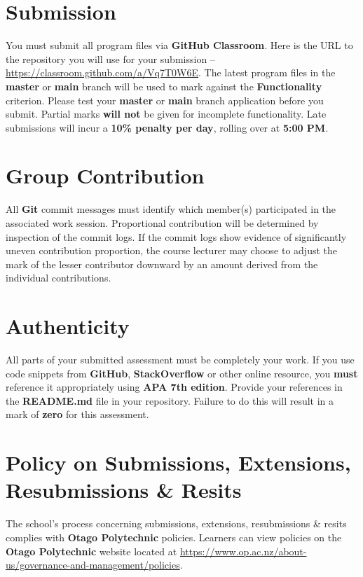 \documentclass{article}
\begin{document}
\section*{Submission}
You must submit all program files via \textbf{GitHub Classroom}. Here is the URL to the repository you will use for your submission – \href{https://classroom.github.com/a/Vq7T0W6E}{https://classroom.github.com/a/Vq7T0W6E}. The latest program files in the \textbf{master} or \textbf{main} branch will be used to mark against the \textbf{Functionality} criterion. Please test your \textbf{master} or \textbf{main} branch application before you submit. Partial marks \textbf{will not} be given for incomplete functionality. Late submissions will incur a \textbf{10\% penalty per day}, rolling over at \textbf{5:00 PM}.

\section*{Group Contribution}
All \textbf{Git} commit messages must identify which member(s) participated in the associated work session. Proportional contribution will be determined by inspection of the commit logs. If the commit logs show evidence of significantly uneven contribution proportion, the course lecturer may choose to adjust the mark of the lesser contributor downward by an amount derived from the individual contributions.

\section*{Authenticity}
All parts of your submitted assessment must be completely your work. If you use code snippets from \textbf{GitHub}, \textbf{StackOverflow} or other online resource, you \textbf{must} reference it appropriately using \textbf{APA 7th edition}. Provide your references in the \textbf{README.md} file in your repository. Failure to do this will result in a mark of \textbf{zero} for this assessment.

\section*{Policy on Submissions, Extensions, Resubmissions \& Resits}
The school's process concerning submissions, extensions, resubmissions \& resits complies with \textbf{Otago Polytechnic} policies. Learners can view policies on the \textbf{Otago Polytechnic} website located at \href{https://www.op.ac.nz/about-us/governance-and-management/policies}{https://www.op.ac.nz/about-us/governance-and-management/policies}.
\end{document}
